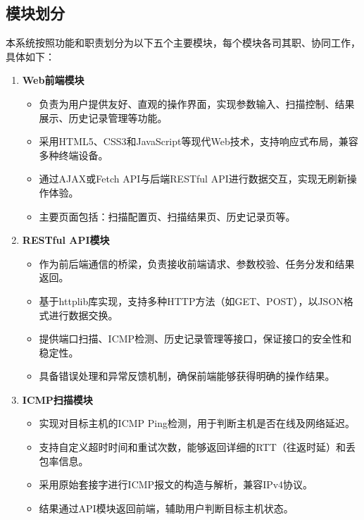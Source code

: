 \documentclass[12pt,hyperref,a4paper,UTF8]{ctexart}
\begin{document}

\subsection{模块划分}

本系统按照功能和职责划分为以下五个主要模块，每个模块各司其职、协同工作，具体如下：

\begin{enumerate}
    \item \textbf{Web前端模块}
    \begin{itemize}
        \item 负责为用户提供友好、直观的操作界面，实现参数输入、扫描控制、结果展示、历史记录管理等功能。
        \item 采用HTML5、CSS3和JavaScript等现代Web技术，支持响应式布局，兼容多种终端设备。
        \item 通过AJAX或Fetch API与后端RESTful API进行数据交互，实现无刷新操作体验。
        \item 主要页面包括：扫描配置页、扫描结果页、历史记录页等。
    \end{itemize}

    \item \textbf{RESTful API模块}
    \begin{itemize}
        \item 作为前后端通信的桥梁，负责接收前端请求、参数校验、任务分发和结果返回。
        \item 基于httplib库实现，支持多种HTTP方法（如GET、POST），以JSON格式进行数据交换。
        \item 提供端口扫描、ICMP检测、历史记录管理等接口，保证接口的安全性和稳定性。
        \item 具备错误处理和异常反馈机制，确保前端能够获得明确的操作结果。
    \end{itemize}

    \item \textbf{ICMP扫描模块}
    \begin{itemize}
        \item 实现对目标主机的ICMP Ping检测，用于判断主机是否在线及网络延迟。
        \item 支持自定义超时时间和重试次数，能够返回详细的RTT（往返时延）和丢包率信息。
        \item 采用原始套接字进行ICMP报文的构造与解析，兼容IPv4协议。
        \item 结果通过API模块返回前端，辅助用户判断目标主机状态。
    \end{itemize}


\end{enumerate}
\end{document}
